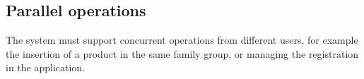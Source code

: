 \subsection{Parallel operations}
The system must support concurrent operations from different users, for example the insertion of a product in the same family group, or managing the registration in the application.